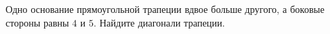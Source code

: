 \begin{ex}
	\begin{condition}
		Одно основание прямоугольной трапеции вдвое больше другого, а боковые стороны равны \( 4  \) и \( 5 \). Найдите диагонали трапеции.
	\end{condition}
\end{ex}